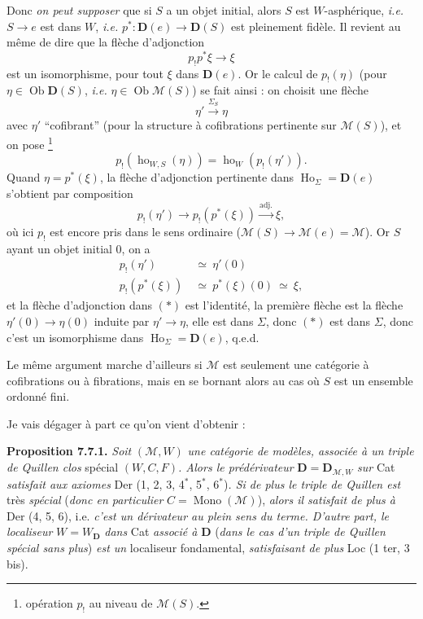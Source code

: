 \documentclass[11pt]{article}
\newcommand{\printedpage}[1]{\marginpar{\footnotesize p.~#1}}
\newcommand{\msp}[1]{\marginpar{\footnotesize [#1]}}
\begin{document}
Donc \textit{on peut supposer} que si $S$ a un objet initial, alors $S$ est $W$-asphérique, \textit{i.e.} $S\longrightarrow e$ est dans $W$, \textit{i.e.} $p^*:\mathbf{D}(e)\longrightarrow\mathbf{D}(S)$ est pleinement fidèle. Il revient au même de dire que la flèche d'adjonction
\[ p_!p^*\xi\longrightarrow\xi \]
est un isomorphisme, pour tout $\xi$ dans $\mathbf{D}(e)$. Or le calcul de $p_!(\eta)$ (pour $\eta\in\operatorname{Ob}\mathbf{D}(S)$, \textit{i.e.} $\eta\in\operatorname{Ob}\mathcal{M}(S)$) se fait ainsi : on choisit une flèche
\[ \eta'\xrightarrow{\Sigma_S}\eta \]
avec $\eta'$ ``cofibrant'' (pour la structure à cofibrations pertinente sur $\mathcal{M}(S)$), et on
\msp{page 116}
pose \footnote[54]{opération $p_!$ au niveau de $\mathcal{M}(S)$.}
\[ p_!(\operatorname{ho}_{W,S}(\eta))=\operatorname{ho}_W(p_!(\eta')). \]
Quand $\eta=p^*(\xi)$, la flèche d'adjonction pertinente dans $\operatorname{Ho}_\Sigma=\mathbf{D}(e)$ s'obtient par composition
\[ p_!(\eta')\longrightarrow p_!(p^*(\xi))\xrightarrow{\text{adj.}}\xi, \tag*{$(*)$} \]
où ici $p_!$ est encore pris dans le sens ordinaire ($\mathcal{M}(S)\longrightarrow\mathcal{M}(e)=\mathcal{M}$). Or $S$ ayant un objet initial 0, on a
\[ \begin{aligned}
p_!(\eta') &\ \simeq\ \eta'(0)\\
p_!(p^*(\xi)) &\ \simeq\ p^*(\xi)(0)\ \simeq\ \xi,
\end{aligned} \]
et la flèche d'adjonction dans $(*)$ est l'identité, la première flèche est la flèche $\eta'(0)\longrightarrow\eta(0)$ induite par $\eta'\longrightarrow\eta$, elle est dans $\Sigma$, donc $(*)$ est dans $\Sigma$, donc c'est un isomorphisme dans $\operatorname{Ho}_\Sigma=\mathbf{D}(e)$, q.e.d.

Le même argument marche d'ailleurs si $\mathcal{M}$ est seulement une catégorie à cofibrations ou à fibrations, mais en se bornant alors au cas où $S$ est un ensemble ordonné fini.

\printedpage{55}
\msp{page 117}
Je vais dégager à part ce qu'on vient d'obtenir :

\textbf{Proposition 7.7.1.} \textit{Soit} $(\mathcal{M},W)$ \textit{une catégorie de modèles, associée à un triple de Quillen clos} spécial $(W,C,F)$\textit{. Alors le prédérivateur} $\mathbf{D}=\mathbf{D}_{\mathcal{M},W}$ \textit{sur} Cat \textit{satisfait aux axiomes} Der (1, 2, 3, 4$^*$, 5$^*$, 6$^*$)\textit{. Si de plus le triple de Quillen est} très \textit{spécial} (\textit{donc en particulier} $C=\operatorname{Mono}(\mathcal{M})$), \textit{alors il satisfait de plus à} Der (4, 5, 6), i.e. \textit{c'est un dérivateur au plein sens du terme. D'autre part, le localiseur} $W=W_{\mathbf{D}}$ \textit{dans} Cat \textit{associé à} $\mathbf{D}$ (\textit{dans le cas d'un triple de Quillen spécial sans plus}) \textit{est un} localiseur fondamental, \textit{satisfaisant de plus} Loc (1 ter, 3 bis).
\end{document}
